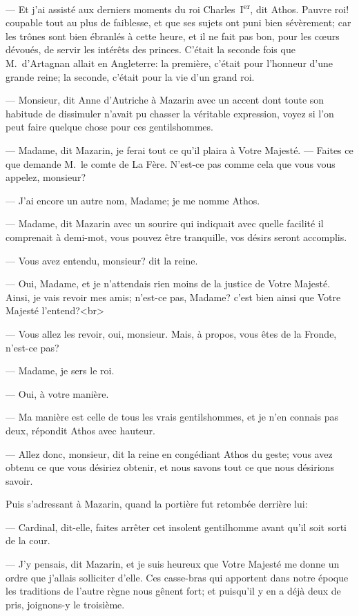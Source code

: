 — Et j'ai assisté aux derniers moments du roi Charles~I\textsuperscript{er}, dit Athos. Pauvre roi! coupable tout au plus de faiblesse, et que ses sujets ont puni bien sévèrement; car les trônes sont bien ébranlés à cette heure, et il ne fait pas bon, pour les cœurs dévoués, de servir les intérêts des princes. C'était la seconde fois que M.~d'Artagnan allait en Angleterre: la première, c'était pour l'honneur d'une grande reine; la seconde, c'était pour la vie d'un grand roi.

— Monsieur, dit Anne d'Autriche à Mazarin avec un accent dont toute son habitude de dissimuler n'avait pu chasser la véritable expression, voyez si l'on peut faire quelque chose pour ces gentilshommes.

— Madame, dit Mazarin, je ferai tout ce qu'il plaira à Votre Majesté.
— Faites ce que demande M.~le comte de La Fère. N'est-ce pas comme cela que vous vous appelez, monsieur?

— J'ai encore un autre nom, Madame; je me nomme Athos.

— Madame, dit Mazarin avec un sourire qui indiquait avec quelle facilité il comprenait à demi-mot, vous pouvez être tranquille, vos désirs seront accomplis.

— Vous avez entendu, monsieur? dit la reine.

— Oui, Madame, et je n'attendais rien moins de la justice de Votre Majesté. Ainsi, je vais revoir mes amis; n'est-ce pas,
Madame? c'est bien ainsi que Votre Majesté l'entend?<br> 

— Vous allez les revoir, oui, monsieur. Mais, à propos, vous êtes de la Fronde, n'est-ce pas?

— Madame, je sers le roi.

— Oui, à votre manière.

— Ma manière est celle de tous les vrais gentilshommes, et je n'en connais pas deux, répondit Athos avec hauteur.

— Allez donc, monsieur, dit la reine en congédiant Athos du geste; vous avez obtenu ce que vous désiriez obtenir, et nous savons tout ce que nous désirions savoir.

Puis s'adressant à Mazarin, quand la portière fut retombée derrière lui:

— Cardinal, dit-elle, faites arrêter cet insolent gentilhomme avant qu'il soit sorti de la cour.

— J'y pensais, dit Mazarin, et je suis heureux que Votre Majesté me donne un ordre que j'allais solliciter d'elle. Ces casse-bras qui apportent dans notre époque les traditions de l'autre règne nous gênent fort; et puisqu'il y en a déjà deux de pris, joignons-y le troisième.

